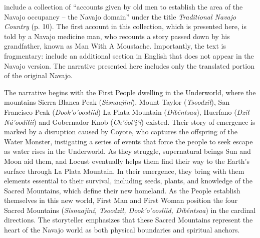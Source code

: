 \citet{Young:1954jz} include a collection of ``accounts given by old men to establish the area of the Navajo occupancy -- the Navajo domain'' under the title \textit{Traditional Navajo Country} (p. 10). The first account in this collection, which is presented here, is told by a Navajo medicine man, who recounts a story passed down by his grandfather, known as Man With A Moustache. Importantly, the text is fragmentary: \citet[13--14]{Young:1954jz} include an additional section in English that does not appear in the Navajo version. The narrative presented here includes only the translated portion of the original Navajo.

The narrative begins with the First People dwelling in the Underworld, where the mountains Sierra Blanca Peak (\textit{Sisnaajiní}), Mount Taylor (\textit{Tsoodził}), San Francisco Peak (\textit{Dook’o’oosłííd}) La Plata Mountain (\textit{Dibéntsaa}), Huerfano (\textit{Dził Ná’oodi\-łii}) and Gobernador Knob (\textit{Ch’óol’į́’í}) existed. Their story of emergence is marked by a disruption caused by Coyote, who captures the offspring of the Water Monster, instigating a series of events that force the people to seek escape as water rises in the Underworld. As they struggle, supernatural beings Sun and Moon aid them, and Locust eventually helps them find their way to the Earth's surface through La Plata Mountain. In their emergence, they bring with them elements essential to their survival, including seeds, plants, and knowledge of the Sacred Mountains, which define their new homeland. As the People establish themselves in this new world, First Man and First Woman position the four Sacred Mountains (\textit{Sisnaajiní, Tsoodził, Dook’o’ooslííd, Dibéntsaa}) in the cardinal directions. The storyteller emphasizes that these Sacred Mountains represent the heart of the Navajo world as both physical boundaries and spiritual anchors.

